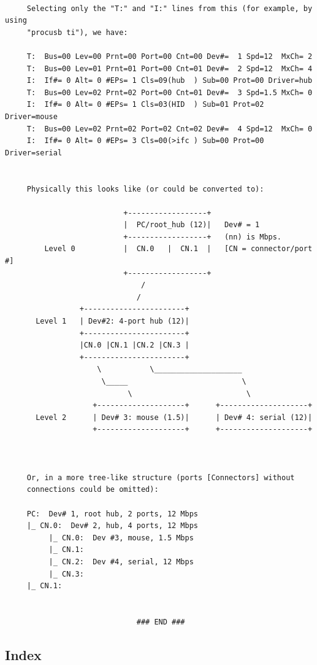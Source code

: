 \begin{verbatim}
     
     Selecting only the "T:" and "I:" lines from this (for example, by using
     "procusb ti"), we have:
     
     T:  Bus=00 Lev=00 Prnt=00 Port=00 Cnt=00 Dev#=  1 Spd=12  MxCh= 2
     T:  Bus=00 Lev=01 Prnt=01 Port=00 Cnt=01 Dev#=  2 Spd=12  MxCh= 4
     I:  If#= 0 Alt= 0 #EPs= 1 Cls=09(hub  ) Sub=00 Prot=00 Driver=hub
     T:  Bus=00 Lev=02 Prnt=02 Port=00 Cnt=01 Dev#=  3 Spd=1.5 MxCh= 0
     I:  If#= 0 Alt= 0 #EPs= 1 Cls=03(HID  ) Sub=01 Prot=02 Driver=mouse
     T:  Bus=00 Lev=02 Prnt=02 Port=02 Cnt=02 Dev#=  4 Spd=12  MxCh= 0
     I:  If#= 0 Alt= 0 #EPs= 3 Cls=00(>ifc ) Sub=00 Prot=00 Driver=serial
     
     
     Physically this looks like (or could be converted to):
     
                           +------------------+
                           |  PC/root_hub (12)|   Dev# = 1
                           +------------------+   (nn) is Mbps.
         Level 0           |  CN.0   |  CN.1  |   [CN = connector/port #]
                           +------------------+
                               /
                              /
                 +-----------------------+
       Level 1   | Dev#2: 4-port hub (12)|
                 +-----------------------+
                 |CN.0 |CN.1 |CN.2 |CN.3 |
                 +-----------------------+
                     \           \____________________
                      \_____                          \
                            \                          \
                    +--------------------+      +--------------------+
       Level 2      | Dev# 3: mouse (1.5)|      | Dev# 4: serial (12)|
                    +--------------------+      +--------------------+
     
     
     
     Or, in a more tree-like structure (ports [Connectors] without
     connections could be omitted):
     
     PC:  Dev# 1, root hub, 2 ports, 12 Mbps
     |_ CN.0:  Dev# 2, hub, 4 ports, 12 Mbps
          |_ CN.0:  Dev #3, mouse, 1.5 Mbps
          |_ CN.1:
          |_ CN.2:  Dev #4, serial, 12 Mbps
          |_ CN.3:
     |_ CN.1:
     
     
                              ### END ###
\end{verbatim}
\normalsize

\label{Index}

\subsection*{Index}

